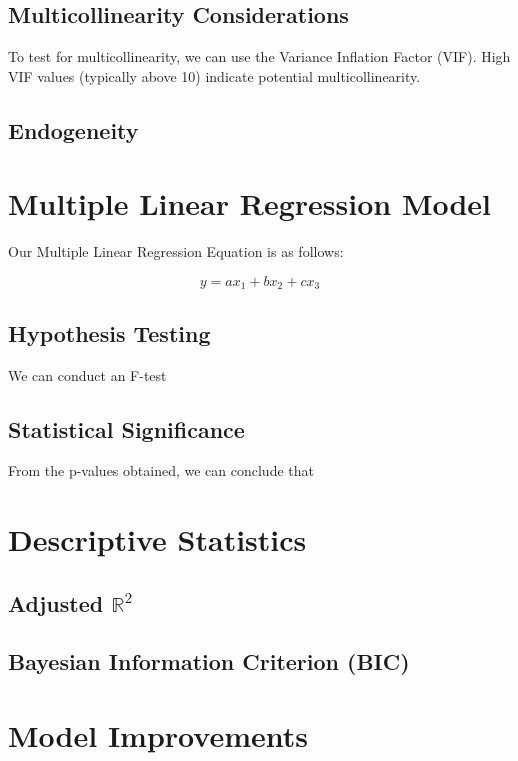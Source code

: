 \documentclass{article}
\begin{document}
\subsection{Multicollinearity Considerations}
To test for multicollinearity, we can use the Variance Inflation Factor (VIF). High VIF values (typically above 10) indicate potential multicollinearity.

\subsection{Endogeneity}

\section{Multiple Linear Regression Model}

Our Multiple Linear Regression Equation is as follows: 

\begin{equation}
    y = ax_1 + bx_2 + cx_3
\end{equation}

\subsection{Hypothesis Testing}
We can conduct an F-test 

\subsection{Statistical Significance}
From the p-values obtained, we can conclude that 

\section{Descriptive Statistics}

\subsection{Adjusted $\mathbb{R}^2$}

\subsection{Bayesian Information Criterion (BIC)}

\section{Model Improvements}
\end{document}
